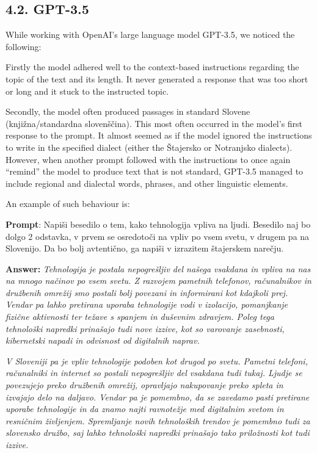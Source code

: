 \documentclass[fleqn,moreauthors,10pt]{ds_report}
\begin{document}
\subsection*{4.2. GPT-3.5}

While working with OpenAI’s large language model GPT-3.5, we noticed the following:

    Firstly the model adhered well to the context-based instructions regarding the topic of the text and its length. It never generated a response that was too short or long and it stuck to the instructed topic. 

    Secondly, the model often produced passages in standard Slovene (knjižna/standardna slovenščina). This most often occurred in the model’s first response to the prompt. It almost seemed as if the model ignored the instructions to write in the specified dialect (either the Štajersko or Notranjsko dialects). However, when another prompt followed with the instructions to once again “remind” the model to produce text that is not standard, GPT-3.5 managed to include regional and dialectal words, phrases, and other linguistic elements. 

An example of such behaviour is:

\textbf{Prompt}:
Napiši besedilo o tem, kako tehnologija vpliva na ljudi. Besedilo naj bo dolgo 2 odstavka, v prvem se osredotoči na vpliv po vsem svetu, v drugem pa na Slovenijo. Da bo bolj avtentično, ga napiši v izrazitem štajerskem narečju.

\textbf{Answer:}
\textit{Tehnologija je postala nepogrešljiv del našega vsakdana in vpliva na nas na mnogo načinov po vsem svetu. Z razvojem pametnih telefonov, računalnikov in družbenih omrežij smo postali bolj povezani in informirani kot kdajkoli prej. Vendar pa lahko pretirana uporaba tehnologije vodi v izolacijo, pomanjkanje fizične aktivnosti ter težave s spanjem in duševnim zdravjem. Poleg tega tehnološki napredki prinašajo tudi nove izzive, kot so varovanje zasebnosti, kibernetski napadi in odvisnost od digitalnih naprav.}

\textit{V Sloveniji pa je vpliv tehnologije podoben kot drugod po svetu. Pametni telefoni, računalniki in internet so postali nepogrešljiv del vsakdana tudi tukaj. Ljudje se povezujejo preko družbenih omrežij, opravljajo nakupovanje preko spleta in izvajajo delo na daljavo. Vendar pa je pomembno, da se zavedamo pasti pretirane uporabe tehnologije in da znamo najti ravnotežje med digitalnim svetom in resničnim življenjem. Spremljanje novih tehnoloških trendov je pomembno tudi za slovensko družbo, saj lahko tehnološki napredki prinašajo tako priložnosti kot tudi izzive.}
\end{document}
